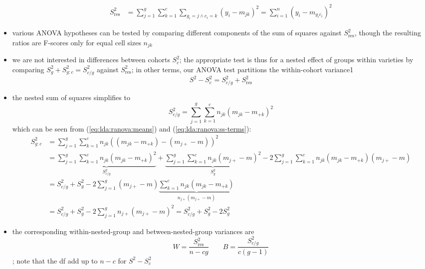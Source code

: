 \documentclass[a4paper]{article}
\begin{document}
\begin{itemize}
\begin{equation}
\begin{split}
      S^2_{\text{res}} &= \sum_{j=1}^g \sum_{k=1}^c \sum_{g_i = j\wedge c_i = k} (y_i - m_{jk})^2 = \sum_{i=1}^n (y_i - m_{g_i c_i})^2
    \end{split}
  \end{equation}
  \citep[775--776]{Bishop:06}
\item various ANOVA hypotheses can be tested by comparing different components of the sum of squares against $S^2_{\text{res}}$, though the resulting ratios are F-scores only for equal cell sizes $n_{jk}$ \citep[777--779]{Bishop:06}
\item we are not interested in differences between cohorts $S^2_c$; the appropriate test is thus for a nested effect of groups within varieties by comparing $S^2_g + S^2_{g:c} = S^2_{c/g}$ against $S^2_{\text{res}}$; in other terms, our ANOVA test partitions the within-cohort variance1
  \[
    S^2 - S^2_c = S^2_{c/g} + S^2_{\text{res}}
  \]
\item the nested sum of squares simplifies to
  \begin{equation}
    \label{eq:lda:ranova:ss-nested}
    S^2_{c/g} = \sum_{j=1}^g \sum_{k=1}^c n_{jk} (m_{jk} - m_{+k})^2 
  \end{equation}
  which can be seen from (\ref{eq:lda:ranova:means}) and (\ref{eq:lda:ranova:ss-terms}):
  \begin{equation*}
    \begin{split}
      S^2_{g:c}
      &= \sum_{j=1}^g \sum_{k=1}^c n_{jk} ((m_{jk} - m_{+k}) - (m_{j+} - m))^2 \\
      &= \underbrace{ \sum_{j=1}^g \sum_{k=1}^c n_{jk} (m_{jk} - m_{+k})^2 }_{S^2_{c/g}}
        + \underbrace{ \sum_{j=1}^g \sum_{k=1}^c n_{jk} (m_{j+} - m)^2 }_{S^2_g}
        - 2 \sum_{j=1}^g \sum_{k=1}^c n_{jk} (m_{jk} - m_{+k})(m_{j+} - m) \\
      &= S^2_{c/g} + S^2_g - 2 \sum_{j=1}^g (m_{j+} - m)
        \underbrace{ \sum_{k=1}^c n_{jk} (m_{jk} - m_{+k}) }_{n_{j+} (m_{j+} - m)} \\
      &= S^2_{c/g} + S^2_g - 2 \sum_{j=1}^g n_{j+} (m_{j+} - m)^2
        = S^2_{c/g} + S^2_g - 2 S^2_g
    \end{split}
  \end{equation*}
\item the corresponding within-nested-group and between-nested-group variances are 
  \begin{equation}
    \label{eq:lda:ranova:WB}
    W = \frac{ S^2_{\text{res}} }{ n - cg } \qquad
    B = \frac{ S^2_{c/g} }{ c(g - 1) }
  \end{equation}
  \citep[778, eq.~(11.8.14)]{Bishop:06}; note that the df add up to $n - c$ for $S^2 - S^2_c$
\end{itemize}
\end{document}
